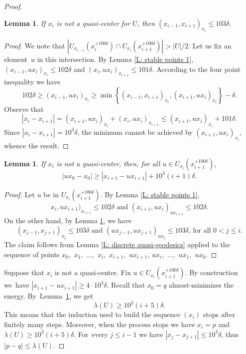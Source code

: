 \documentclass[11pt]{article}
\theoremstyle{plain}
\newtheorem{lem}[thm]{Lemma}
\theoremstyle{definition}
\begin{document}
\begin{proof}
\begin{lem}\label{L: stable points 2}
If $x_i$ is not a quasi-center for $U$, then $(x_{i-1},x_{i+1})_{x_i}\leqslant 103\delta$.
\end{lem}

\begin{proof}
We note that $ |U_{x_{i-1}}(x_{i}^{+100\delta}) \cap U_{x_{i}}(x_{i+1}^{+100\delta})|>|U|/2.$
Let us fix an element~$u$ in this intersection.
By Lemma \ref{L: stable points 1}, $(x_{i-1},ux_i)_{x_i} \leq 102\delta$ and $(x_{i},ux_{i})_{x_{i+1}}\leq 101\delta$.
According to the four point inequality we have
\begin{equation*}
102 \delta
\geq (x_{i-1},ux_i)_{x_i}
\geq \min \left\{ (x_{i-1},x_{i+1})_{x_i}, (x_{i+1},ux_i)_{x_i}\right\} - \delta.
\end{equation*}
Observe that
\begin{equation*}
|x_i - x_{i+1}|
= (x_{i+1}, ux_i)_{x_i} +(x_i,ux_i)_{x_{i+1}}
\leq (x_{i+1}, ux_i)_{x_i} + 101\delta.
\end{equation*}
Since $|x_i - x_{i+1}| = 10^3\delta$, the minimum cannot be achieved by $(x_{i+1},ux_i)_{x_i}$, whence the result.
\end{proof}

\begin{lem}\label{L: stable points 3} If $x_i$ is not a quasi-center, then, for all $u\in U_{x_i}(x_{i+1}^{+100 \delta})$,
\[
|ux_0 -x_0 | \geq |{x_{i+1}}-ux_{i+1}| + 10^3(i+1) \delta .
\]
\end{lem}

\begin{proof}
Let $u$ be in $U_{x_i}(x_{i+1}^{+100 \delta})$.
By Lemma \ref{L: stable points 1},
\begin{equation*}
x_i,ux_{i+1})_{x_{i+1}} \leq 102\delta \text{ and } (x_{i+1},ux_i)_{ux_{i+1}} \leq 102\delta.
\end{equation*}
On the other hand, by Lemma \ref{L: stable points 2}, we have
\begin{equation*}
(x_{j-1},x_{j+1})_{x_{j}} \leqslant 103\delta \text{ and } (ux_{j-1},ux_{j+1})_{ux_{j}}\leqslant 103\delta\text{, for all $0< j \leqslant i$}.
\end{equation*}
The claim follows from Lemma \ref{L: discrete quasi-geodesics} applied to the sequence of points $x_0,$ $x_1,$ $\dots,$ $x_i,$ $x_{i+1},$ $ux_{i+1}$, $ ux_i,$ $\dots,$ $ux_1,$ $ux_0$.
\end{proof}

Suppose that $x_i$ is not a quasi-center.
Fix $u\in U_{x_i}(x_{i+1}^{+100 \delta})$.
By construction we~have $|{x_{i+1}}-ux_{i+1}|\geq 4\cdot 10^3\delta$.
Recall that $x_0 = q$ almost-minimizes the energy.
By~Lemma~\ref{L: stable points 3}, we get
\[
\lambda(U) \geq 10^3(i+5) \delta. 
\]
This means that the induction used to build the sequence $(x_i)$ stops after finitely many steps.
Moreover, when the process stops we have $x_i = p$ and $\lambda(U) \geq 10^3(i+5) \delta$.
For~every $j \leq i-1$ we have $| x_j - x_{j+1}| \leq 10^3\delta$, thus $|p - q| \leq \lambda(U)$.
\end{proof}
\end{document}
